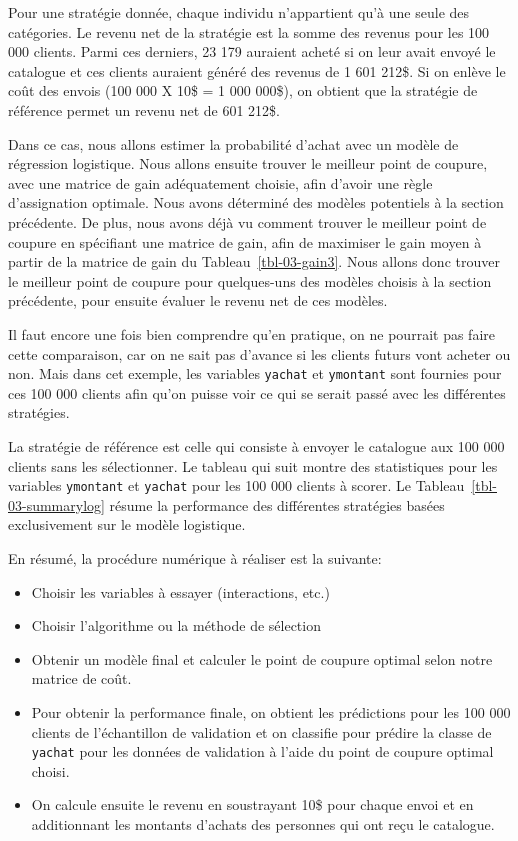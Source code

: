 \documentclass[
  11pt,
  letterpaper,
]{scrbook}
\providecommand{\tightlist}{%
  \setlength{\itemsep}{0pt}\setlength{\parskip}{0pt}}\usepackage{longtable,booktabs,array}
\theoremstyle{definition}
\theoremstyle{remark}
\begin{document}
Pour une stratégie donnée, chaque individu n'appartient qu'à une seule
des catégories. Le revenu net de la stratégie est la somme des revenus
pour les 100 000 clients. Parmi ces derniers, 23 179 auraient acheté si
on leur avait envoyé le catalogue et ces clients auraient généré des
revenus de 1 601 212\$. Si on enlève le coût des envois (100 000 X 10\$
= 1 000 000\$), on obtient que la stratégie de référence permet un
revenu net de 601 212\$.

Dans ce cas, nous allons estimer la probabilité d'achat avec un modèle
de régression logistique. Nous allons ensuite trouver le meilleur point
de coupure, avec une matrice de gain adéquatement choisie, afin d'avoir
une règle d'assignation optimale. Nous avons déterminé des modèles
potentiels à la section précédente. De plus, nous avons déjà vu comment
trouver le meilleur point de coupure en spécifiant une matrice de gain,
afin de maximiser le gain moyen à partir de la matrice de gain du
Tableau~\ref{tbl-03-gain3}. Nous allons donc trouver le meilleur point
de coupure pour quelques-uns des modèles choisis à la section
précédente, pour ensuite évaluer le revenu net de ces modèles.

Il faut encore une fois bien comprendre qu'en pratique, on ne pourrait
pas faire cette comparaison, car on ne sait pas d'avance si les clients
futurs vont acheter ou non. Mais dans cet exemple, les variables
\texttt{yachat} et \texttt{ymontant} sont fournies pour ces 100 000
clients afin qu'on puisse voir ce qui se serait passé avec les
différentes stratégies.

La stratégie de référence est celle qui consiste à envoyer le catalogue
aux 100 000 clients sans les sélectionner. Le tableau qui suit montre
des statistiques pour les variables \texttt{ymontant} et \texttt{yachat}
pour les 100 000 clients à scorer. Le Tableau~\ref{tbl-03-summarylog}
résume la performance des différentes stratégies basées exclusivement
sur le modèle logistique.

En résumé, la procédure numérique à réaliser est la suivante:

\begin{itemize}
\tightlist
\item
  Choisir les variables à essayer (interactions, etc.)
\item
  Choisir l'algorithme ou la méthode de sélection
\item
  Obtenir un modèle final et calculer le point de coupure optimal selon
  notre matrice de coût.
\item
  Pour obtenir la performance finale, on obtient les prédictions pour
  les 100 000 clients de l'échantillon de validation et on classifie
  pour prédire la classe de \texttt{yachat} pour les données de
  validation à l'aide du point de coupure optimal choisi.
\item
  On calcule ensuite le revenu en soustrayant 10\$ pour chaque envoi et
  en additionnant les montants d'achats des personnes qui ont reçu le
  catalogue.
\end{itemize}
\end{document}
